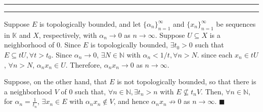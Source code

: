\documentclass[11pt]{article}
\newcounter{questionCounter}
\newcounter{partCounter}[questionCounter]
\newenvironment{question}[2][\arabic{questionCounter}]{%
    \setcounter{partCounter}{0}%
    \vspace{.25in} \hrule \vspace{0.5em}%
        \noindent{\bf #2}%
    \vspace{0.8em} \hrule \vspace{.10in}%
    \addtocounter{questionCounter}{1}%
}{}
\renewcommand{\qed}{\quad $\blacksquare$}
\newcommand{\N}{\mathbb{N}} %
\newcommand{\K}{\mathbb{K}} %
\begin{document}
\newpage
\begin{question}{Problem 4}
Suppose $E$ is topologically bounded, and let $\{\alpha_n\}_{n = 1}^\infty$ and
$\{x_n\}_{n = 1}^\infty$ be sequences in $\K$ and $X$, respectively, with
$\alpha_n \to 0$ as $n \to \infty$. Suppose $U \subseteq X$ is a neighborhood
of $0$. Since $E$ is topologically bounded, $\exists t_0 > 0$ such that
$E \subseteq tU, \forall t > t_0$. Since $\alpha_n \to 0$, $\exists N \in \N$
with $\alpha_n < 1/t, \forall n > N$. since each $x_n \in tU$, $\forall n > N$,
$\alpha_nx_n \in U$. Therefore, $\alpha_nx_n \to 0$ as $n \to \infty$.

Suppose, on the other hand, that $E$ is not topologically bounded, so that
there is a neighborhood $V$ of $0$ such that, $\forall n \in \N, \exists t_n > n$
with $E \not\subseteq t_nV$. Then, $\forall n \in \N$, for
$\alpha_n = \frac{1}{t_n}$, $\exists x_n \in E$ with $\alpha_nx_n \notin V$, and
hence $\alpha_nx_n \not\to 0$ as $n \to \infty$. \qed
\end{question}
\end{document}
